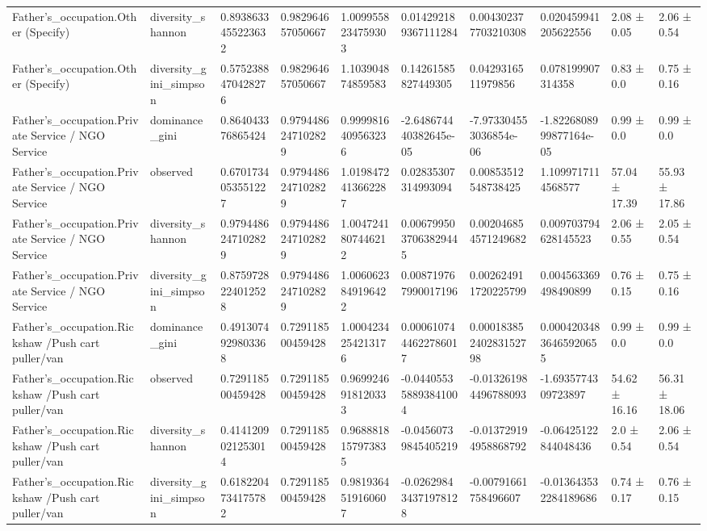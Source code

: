 \begin{longtable}{llllllllll}
Father’s\_occupation.Other (Specify) & diversity\_shannon & 0.8938633455223632 & 0.982964657050667 & 1.0099558234759303 & 0.014292189367111284 & 0.004302377703210308 & 0.020459941205622556 & 2.08 ± 0.05 & 2.06 ± 0.54 \\
Father’s\_occupation.Other (Specify) & diversity\_gini\_simpson & 0.5752388470428276 & 0.982964657050667 & 1.103904874859583 & 0.14261585827449305 & 0.0429316511979856 & 0.078199907314358 & 0.83 ± 0.0 & 0.75 ± 0.16 \\
Father’s\_occupation.Private Service / NGO Service & dominance\_gini & 0.864043376865424 & 0.9794486247102829 & 0.9999816409563236 & -2.648674440382645e-05 & -7.973304553036854e-06 & -1.8226808999877164e-05 & 0.99 ± 0.0 & 0.99 ± 0.0 \\
Father’s\_occupation.Private Service / NGO Service & observed & 0.6701734053551227 & 0.9794486247102829 & 1.0198472413662287 & 0.02835307314993094 & 0.00853512548738425 & 1.1099717114568577 & 57.04 ± 17.39 & 55.93 ± 17.86 \\
Father’s\_occupation.Private Service / NGO Service & diversity\_shannon & 0.9794486247102829 & 0.9794486247102829 & 1.0047241807446212 & 0.0067995037063829445 & 0.002046854571249682 & 0.009703794628145523 & 2.06 ± 0.55 & 2.05 ± 0.54 \\
Father’s\_occupation.Private Service / NGO Service & diversity\_gini\_simpson & 0.8759728224012528 & 0.9794486247102829 & 1.0060623849196422 & 0.008719767990017196 & 0.002624911720225799 & 0.004563369498490899 & 0.76 ± 0.15 & 0.75 ± 0.16 \\
Father’s\_occupation.Rickshaw /Push cart puller/van & dominance\_gini & 0.4913074929803368 & 0.729118500459428 & 1.0004234254213176 & 0.0006107444622786017 & 0.00018385240283152798 & 0.00042034836465920655 & 0.99 ± 0.0 & 0.99 ± 0.0 \\
Father’s\_occupation.Rickshaw /Push cart puller/van & observed & 0.729118500459428 & 0.729118500459428 & 0.9699246918120333 & -0.044055358893841004 & -0.013261984496788093 & -1.6935774309723897 & 54.62 ± 16.16 & 56.31 ± 18.06 \\
Father’s\_occupation.Rickshaw /Push cart puller/van & diversity\_shannon & 0.4141209021253014 & 0.729118500459428 & 0.9688818157973835 & -0.04560739845405219 & -0.013729194958868792 & -0.06425122844048436 & 2.0 ± 0.54 & 2.06 ± 0.54 \\
Father’s\_occupation.Rickshaw /Push cart puller/van & diversity\_gini\_simpson & 0.6182204734175782 & 0.729118500459428 & 0.9819364519160607 & -0.026298434371978128 & -0.00791661758496607 & -0.013643532284189686 & 0.74 ± 0.17 & 0.76 ± 0.15 \\

\end{longtable}
